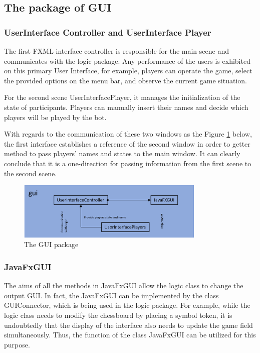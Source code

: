
\subsection{The package of GUI}

\subsubsection{UserInterface Controller and UserInterface Player}

The first FXML interface controller is responsible for the main scene and communicates with the logic package. Any performance of the users is exhibited on this primary User Interface, for example, players can operate the game, select the provided options on the menu bar, and observe the current game situation. 

For the second scene UserInterfacePlayer, it manages the initialization of the state of participants. Players can manually insert their names and decide which players will be played by the bot. 

With regards to the communication of these two windows as the Figure \ref{fig:guiPackage} below, the first interface establishes a reference of the second window in order to getter method to pass players' names and states to the main window. 
It can clearly conclude that it is a one-direction for passing information from the first scene to the second scene. 


\begin{figure}[h]
	\centering
	\includegraphics[width=0.8\textwidth]{image/diagram_2}
	\caption{The GUI package}
	\label{fig:guiPackage}
\end{figure}

\subsubsection{JavaFxGUI}
The aims of all the methods in JavaFxGUI allow the logic class to change the output GUI. In fact, the JavaFxGUI can be implemented by the class GUIConnector, which is being used in the logic package. For example, while the logic class needs to modify the chessboard by placing a symbol token, it is undoubtedly that the display of the interface also needs to update the game field simultaneously. 
Thus, the function of the class JavaFxGUI can be utilized for this purpose. 